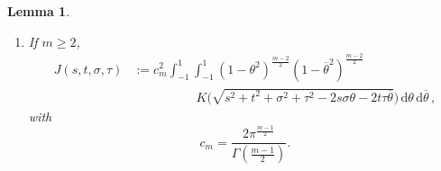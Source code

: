 \documentclass[12pt,reqno]{amsart}
\newtheorem{lemma}[theorem]{Lemma}
\theoremstyle{definition}
\theoremstyle{remark}
\renewcommand{\d}{\,\mathrm{d}} %
\newcommand{\bpar}[1]{\left ( {#1}\right )}
\def\ds{\displaystyle}
\numberwithin{equation}{section}
\begin{document}
\begin{lemma}
\begin{enumerate}
		\item If $m\geq 2$,
		\begin{align}
		J(s,t,\sigma, \tau) &:= c_m ^2  \int_{-1}^1  \int_{-1}^1  (1-\theta^2)^{\frac{m-2}{2}} (1-\overline{\theta}^2)^{\frac{m-2}{2}} \nonumber\\
		& \quad \quad \quad \quad \quad
		K\Big(\sqrt{s^2 + t^2 + \sigma^2 + \tau^2 -2 s \sigma \theta -2 t \tau \overline{\theta}}\Big) \d \theta \d \overline{\theta}\,, \label{Eq:KernelSTVariables2}
		\end{align}
		with
		$$
		c_m = \dfrac{2 \pi^{\frac{m-1}{2}}}{\Gamma (\frac{m-1}{2})}.
		$$
	\end{enumerate}
\end{lemma}
\end{document}
